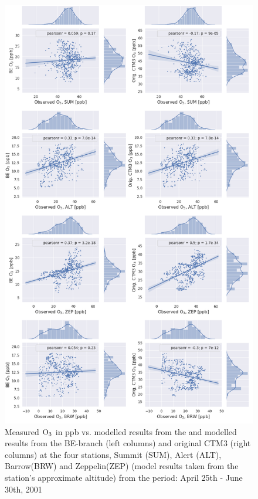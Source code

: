 \begin{figure}[ht]
    \centering
    \includegraphics[width = 0.8\linewidth]{Chapter6_Results/images/jointplot_AprJune_O3_2001.png}
    \caption{Measured $\mathrm{O_3}$ in ppb vs. modelled results from the and modelled results from the BE-branch (left columns) and original CTM3 (right columns) at the four stations, Summit (SUM), Alert (ALT), Barrow(BRW) and Zeppelin(ZEP) (model results taken from the station's approximate altitude) from the period: April 25th - June 30th, 2001}
    \label{fig:joint_AprMay}
\end{figure}